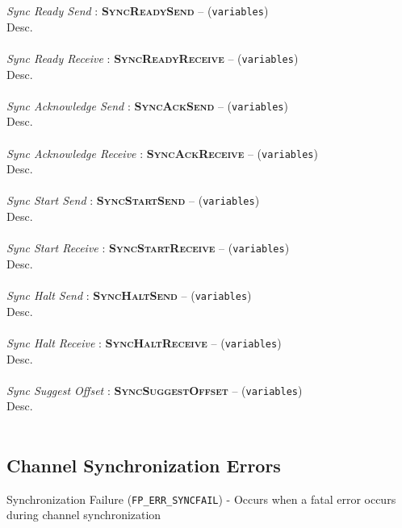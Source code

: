 \textit{Sync Ready Send} : \textbf{\textsc{SyncReadySend}} -- (\texttt{variables})\\
Desc.
\\
\\
\textit{Sync Ready Receive} : \textbf{\textsc{SyncReadyReceive}} -- (\texttt{variables})\\
Desc.
\\
\\
\textit{Sync Acknowledge Send} : \textbf{\textsc{SyncAckSend}} -- (\texttt{variables})\\
Desc.
\\
\\
\textit{Sync Acknowledge Receive} : \textbf{\textsc{SyncAckReceive}} -- (\texttt{variables})\\
Desc.
\\
\\
\textit{Sync Start Send} : \textbf{\textsc{SyncStartSend}} -- (\texttt{variables})\\
Desc.
\\
\\
\textit{Sync Start Receive} : \textbf{\textsc{SyncStartReceive}} -- (\texttt{variables})\\
Desc.
\\
\\
\textit{Sync Halt Send} : \textbf{\textsc{SyncHaltSend}} -- (\texttt{variables})\\
Desc.
\\
\\
\textit{Sync Halt Receive} : \textbf{\textsc{SyncHaltReceive}} -- (\texttt{variables})\\
Desc.
\\
\\
\textit{Sync Suggest Offset} : \textbf{\textsc{SyncSuggestOffset}} -- (\texttt{variables})\\
Desc.
\\
\\


\subsection{Channel Synchronization Errors}

Synchronization Failure (\texttt{FP\_ERR\_SYNCFAIL}) - Occurs when a fatal error occurs during channel synchronization
